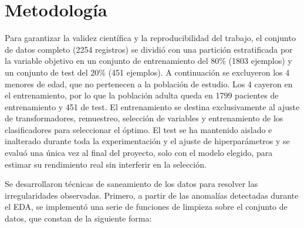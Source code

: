 \documentclass[journal,onecolumn]{IEEEtran}
\begin{document}
\section{Metodología}

Para garantizar la validez científica y la reproducibilidad del trabajo, el conjunto de datos completo (2254 registros) se dividió con una partición estratificada por la variable objetivo en un conjunto de entrenamiento del 80\% (1803 ejemplos) y un conjunto de test del 20\% (451 ejemplos). A continuación se excluyeron los 4 menores de edad, que no pertenecen a la población de estudio. Los 4 cayeron en el entrenamiento, por lo que la población adulta queda en 1799 pacientes de entrenamiento y 451 de test. El entrenamiento se destina exclusivamente al ajuste de transformadores, remuestreo, selección de variables y entrenamiento de los clasificadores para seleccionar el óptimo. El test se ha mantenido aislado e inalterado durante toda la experimentación y el ajuste de hiperparámetros y se evaluó una única vez al final del proyecto, solo con el modelo elegido, para estimar su rendimiento real sin interferir en la selección.

Se desarrollaron técnicas de saneamiento de los datos para resolver las irregularidades observadas. Primero, a partir de las anomalías detectadas durante el EDA, se implementó una serie de funciones de limpieza sobre el conjunto de datos, que constan de la siguiente forma:
\end{document}
